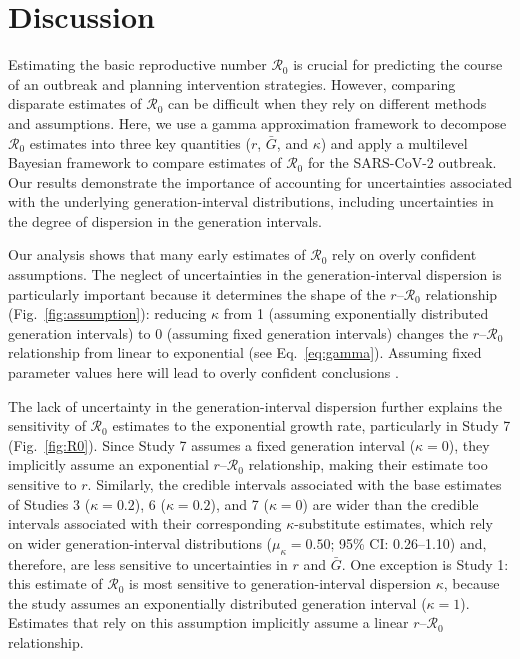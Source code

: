 \documentclass[12pt]{article}
\newcommand{\eref}[1]{Eq.~\ref{eq:#1}}
\newcommand{\fref}[1]{Fig.~\ref{fig:#1}}
\newcommand{\Ro}{\ensuremath{{\mathcal R}_{0}}\xspace}
\begin{document}
\section{Discussion}

Estimating the basic reproductive number \Ro is crucial for predicting the course of an outbreak and planning intervention strategies.
However, comparing disparate estimates of \Ro can be difficult when they rely on different methods and assumptions.
Here, we use a gamma approximation framework \citep{park2019practical} to decompose \Ro estimates into three key quantities ($r$, $\bar G$, and $\kappa$) and apply a multilevel Bayesian framework to compare estimates of \Ro for the SARS-CoV-2 outbreak.
Our results demonstrate the importance of accounting for uncertainties associated with the underlying generation-interval distributions, including uncertainties in the degree of dispersion in the generation intervals.

Our analysis shows that many early estimates of \Ro rely on overly confident assumptions.
The neglect of uncertainties in the generation-interval dispersion is particularly important because it determines the shape of the $r$--\Ro relationship (\fref{assumption}):
reducing $\kappa$ from 1 (assuming exponentially distributed generation intervals) to 0 (assuming fixed generation intervals) changes the $r$--\Ro relationship from linear to exponential (see \eref{gamma}).
Assuming fixed parameter values here will lead to overly confident conclusions \citep{elderd2006uncertainty}.

The lack of uncertainty in the generation-interval dispersion further explains the sensitivity of \Ro estimates to the exponential growth rate, particularly in Study 7 (\fref{R0}).
Since Study 7 assumes a fixed generation interval ($\kappa=0$), they implicitly assume an exponential $r$--\Ro relationship, making their estimate too sensitive to $r$.
Similarly, the credible intervals associated with the base estimates of Studies 3 ($\kappa=0.2$), 6  ($\kappa=0.2$), and 7 ($\kappa=0$) are wider than the credible intervals associated with their corresponding $\kappa$-substitute estimates, which rely on wider generation-interval distributions ($\mu_\kappa=0.50$; 95\% CI: 0.26--1.10) and, therefore, are less sensitive to uncertainties in $r$ and $\bar G$.
One exception is Study 1: this estimate of \Ro is most sensitive to generation-interval dispersion $\kappa$,
because the study assumes an exponentially distributed generation interval ($\kappa=1$). 
Estimates that rely on this assumption implicitly assume a linear $r$--\Ro relationship.
\end{document}
